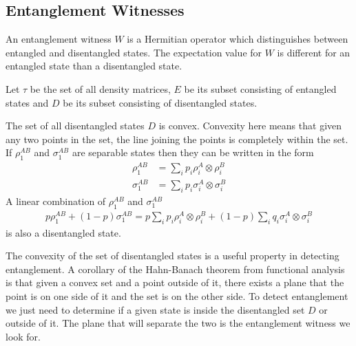 \subsection{Entanglement Witnesses}
An entanglement witness $W$ is a Hermitian operator which distinguishes between entangled and disentangled states. The expectation value for $W$ is different for an entangled state than a disentangled state.
\par Let $\tau$ be the set of all density matrices, $E$ be its subset consisting of entangled states and $D$ be its subset consisting of disentangled states.
\par The set of all disentangled states $D$ is convex. Convexity here means that given any two points in the set, the line joining the points is completely within the set. If $\rho_1^{AB}$ and $\sigma_1^{AB}$ are separable states then they can be written in the form
\begin{align*}
\rho_1^{AB} &= \sum_i p_i \rho_i^A \otimes \rho_i^B \\
\sigma_1^{AB} &= \sum_i p_i \sigma_i^A \otimes \sigma_i^B
\end{align*}
A linear combination of $\rho_1^{AB}$ and $\sigma_1^{AB}$
\begin{align*}
p \rho_1^{AB} + (1-p) \sigma_1^{AB} = p \sum_i p_i \rho_i^A \otimes \rho_i^B + (1-p) \sum_i q_i \sigma_i^A \otimes \sigma_i^B
\end{align*}
is also a disentangled state.
\par The convexity of the set of disentangled states is a useful property in detecting entanglement. A corollary of the Hahn-Banach theorem from functional analysis is that given a convex set and a point outside of it, there exists a plane that the point is on one side of it and the set is on the other side. To detect entanglement we just need to determine if a given state is inside the disentangled set $D$ or outside of it. The plane that will separate the two is the entanglement witness we look for.
